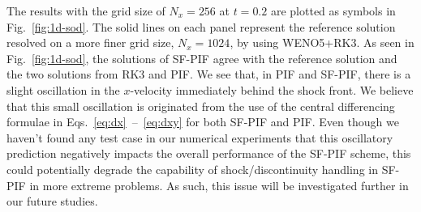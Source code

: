 \documentclass[times,preprint,3p]{elsarticle}
\newcommand{\red}[1]{\color{red} #1 \color{black}}
\begin{document}
The results with the grid size of \( N_{x} = 256 \) at \( t = 0.2 \) are plotted as symbols in Fig.~\ref{fig:1d-sod}.
The solid lines on each panel represent the reference solution resolved on a more finer grid size,
\( N_{x} = 1024 \), by using WENO5+RK3.
%
As seen in Fig.~\ref{fig:1d-sod}, the solutions of SF-PIF agree with the reference solution
and the two solutions from RK3 and PIF\@. We see that,
in PIF and SF-PIF,
there is a slight oscillation in the $x$-velocity immediately behind the shock front.
We believe that this small oscillation is
originated from the use of the central differencing formulae in
Eqs.~\eqref{eq:dx}~--~\eqref{eq:dxy} for both SF-PIF and PIF\@.
Even though we haven't found any test case in our numerical experiments that
this oscillatory prediction negatively impacts the
overall performance of the SF-PIF scheme,
this could potentially degrade the capability of shock/discontinuity
handling in SF-PIF in more extreme problems. As such, this issue will be
investigated further in our future studies.



\end{document}
